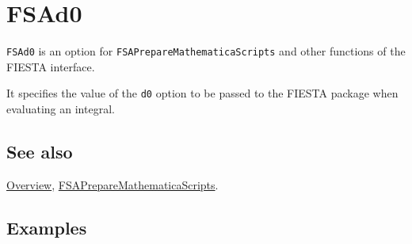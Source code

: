 \documentclass[../FeynHelpersManual.tex]{subfiles}
\begin{document}
\hypertarget{fsad0}{
\section{FSAd0}\label{fsad0}}

\texttt{FSAd0} is an option for \texttt{FSAPrepareMathematicaScripts}
and other functions of the FIESTA interface.

It specifies the value of the \texttt{d0} option to be passed to the
FIESTA package when evaluating an integral.

\subsection{See also}

\hyperlink{toc}{Overview},
\hyperlink{fsapreparemathematicascripts}{FSAPrepareMathematicaScripts}.

\subsection{Examples}
\end{document}
